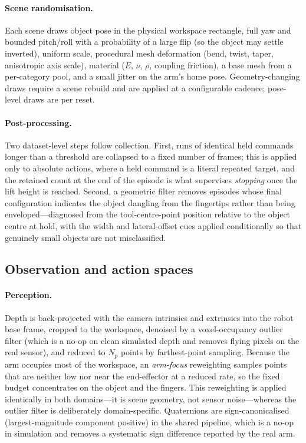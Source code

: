 \paragraph{Scene randomisation.}
Each scene draws object pose in the physical workspace rectangle, full yaw and bounded
pitch/roll with a probability of a large flip (so the object may settle inverted), uniform
scale, procedural mesh deformation (bend, twist, taper, anisotropic axis scale), material
($E$, $\nu$, $\rho$, coupling friction), a base mesh from a per-category pool, and a small
jitter on the arm's home pose. Geometry-changing draws require a scene rebuild and are
applied at a configurable cadence; pose-level draws are per reset.

\paragraph{Post-processing.}
Two dataset-level steps follow collection. First, runs of identical held commands longer
than a threshold are collapsed to a fixed number of frames; this is applied only to absolute
actions, where a held command is a literal repeated target, and the retained count at the end
of the episode is what supervises \emph{stopping} once the lift height is reached. Second, a
geometric filter removes episodes whose final configuration indicates the object dangling
from the fingertips rather than being enveloped---diagnosed from the tool-centre-point
position relative to the object centre at hold, with the width and lateral-offset cues
applied conditionally so that genuinely small objects are not misclassified.

\subsection{Observation and action spaces}
\label{sec:method:spaces}

\paragraph{Perception.}
Depth is back-projected with the camera intrinsics and extrinsics into the robot base frame,
cropped to the workspace, denoised by a voxel-occupancy outlier filter (which is a no-op on
clean simulated depth and removes flying pixels on the real sensor), and reduced to $N_p$
points by farthest-point sampling. Because the arm occupies most of the workspace, an
\emph{arm-focus} reweighting samples points that are neither low nor near the end-effector at
a reduced rate, so the fixed budget concentrates on the object and the fingers. This
reweighting is applied identically in both domains---it is scene geometry, not sensor
noise---whereas the outlier filter is deliberately domain-specific. Quaternions are
sign-canonicalised (largest-magnitude component positive) in the shared pipeline, which is a
no-op in simulation and removes a systematic sign difference reported by the real arm.

